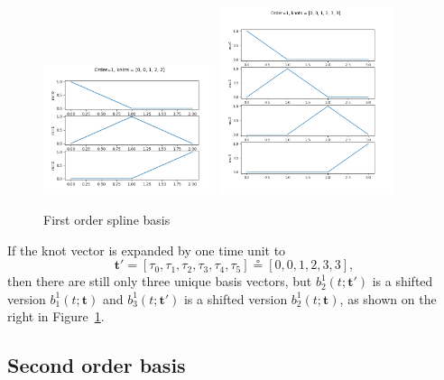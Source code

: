 \documentclass{article}
\newcommand{\defeq}{\circeq}
\begin{document}
\begin{figure}[hbt]
  \centering
  	\includegraphics[width=0.45\textwidth]{./figures/spline_basis_1}
  	\includegraphics[width=0.45\textwidth]{./figures/spline_basis_1_extra_knot}
  \caption{First order spline basis}
  \label{fig:spline_basis_1}  
\end{figure}
If the knot vector is expanded by one time unit to
\[
\mathbf{t}' = [\tau_0, \tau_1, \tau_2, \tau_3, \tau_4, \tau_5] \defeq [0, 0, 1, 2, 3, 3],
\]
then there are still only three unique basis vectors, but 
$b_2^1(t; \mathbf{t}')$ is a shifted version $b_1^1(t; \mathbf{t})$ and $b_3^1(t; \mathbf{t}')$ is a shifted version $b_2^1(t; \mathbf{t})$, as shown on the right in Figure~\ref{fig:spline_basis_1}.

\clearpage


\subsection{Second order basis}
\end{document}
